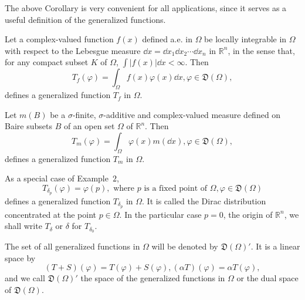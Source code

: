 \begin{remarku} The above Corollary is very convenient for all applications, since it serves as a useful definition of the generalized functions. 
\end{remarku}

\begin{example}\label{ex:I.8.Example.1} Let a complex-valued function $f(x)$ defined a.e. in $\Omega$ be locally integrable in $\Omega$ with respect to the Lebesgue measure $\dd x = \dd x_1 \dd x_2 \cdots \dd x_n$ in $\mathbb{R}^{n}$, in the sense that, for any compact subset $K$ of $\Omega$, $\int |f(x)| \dd x < \infty$. Then 
\begin{equation}\label{eq:I.8.4}
T_{f} (\varphi) = \int_{\Omega} f (x) \varphi (x) \dd x, \varphi \in \mathfrak {D} (\Omega),
\end{equation}
defines a generalized function $T_{f}$ in $\Omega$. 
\end{example}

\begin{example}\label{ex:I.8.Example.2} Let $m(B)$ be a $\sigma$-finite, $\sigma$-additive and complex-valued measure defined on Baire subsets $B$ of an open set $\Omega$ of $\mathbb{R}^{n}$. Then 
\begin{equation}\label{eq:I.8.5}
T_{m} (\varphi) = \int_{\Omega} \varphi (x) m (\dd x), \varphi \in \mathfrak {D} (\Omega),
\end{equation}
defines a generalized function $T_{m}$ in $\Omega$. 
\end{example}

\begin{example}\label{ex:I.8.Example.3} As a special case of Example~\hyperref[ex:I.8.Example.2]{$2$}, 
\begin{equation}\label{eq:I.8.6}
T_{\delta_{p}}(\varphi) = \varphi (p), \text{ where } p \text{ is a fixed point of } \Omega, \varphi \in \mathfrak{D}(\Omega)
\end{equation}
defines a generalized function $T_{\delta_p}$ in $\Omega$. It is called the Dirac distribution concentrated at the point $p\in \Omega$. In the particular case $p= 0$, the origin of $\mathbb{R}^{n}$, we shall write $T_{\delta}$ or $\delta$ for $T_{\delta_0}$. 
\end{example}

\begin{definition}\label{def:I.8.Definition.2} The set of all generalized functions in $\Omega$ will be denoted by $\mathfrak{D}(\Omega)'$. It is a linear space by 
\begin{equation}\label{eq:I.8.7}
(T + S) (\varphi) = T (\varphi) + S (\varphi), (\alpha T) (\varphi) = \alpha T (\varphi),
\end{equation}
and we call $\mathfrak{D}(\Omega)'$ the space of the generalized functions in $\Omega$ or the dual space of $\mathfrak{D}(\Omega)$. 
\end{definition}


